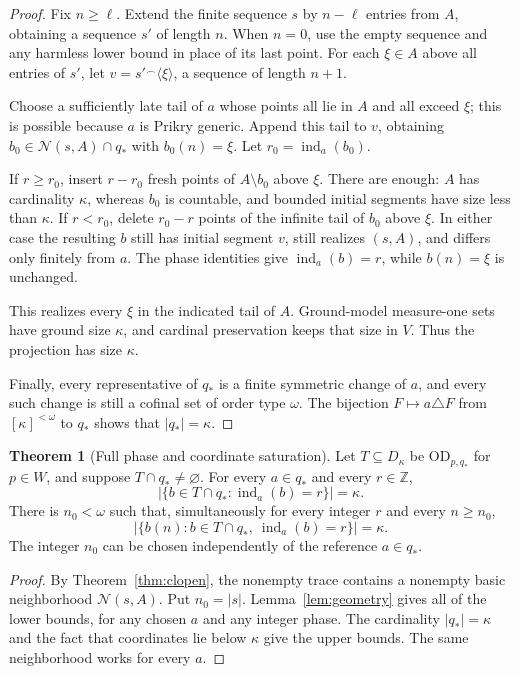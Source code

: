 \documentclass[11pt,letterpaper]{article}
\theoremstyle{definition}
\newtheorem{theorem}[definition]{Theorem}
\numberwithin{equation}{section}
\newcommand{\OD}{\mathrm{OD}}
\newcommand{\ch}{\operatorname{ind}}
\newcommand{\seq}[1]{\langle #1\rangle}
\begin{document}
\begin{proof}
Fix $n\ge\ell$. Extend the finite sequence $s$ by $n-\ell$ entries from $A$,
obtaining a sequence $s'$ of length $n$. When $n=0$, use the empty
sequence and any harmless lower bound in place of its last point. For
each $\xi\in A$ above all entries of $s'$, let
$v=s'{}^\frown\seq{\xi}$, a sequence of length $n+1$.

Choose a sufficiently late tail of $a$ whose points all lie in $A$ and
all exceed $\xi$; this is possible because $a$ is Prikry generic. Append
this tail to $v$, obtaining $b_0\in\mathcal N(s,A)\cap q_*$ with
$b_0(n)=\xi$. Let $r_0=\ch_a(b_0)$.

If $r\ge r_0$, insert $r-r_0$ fresh points of $A\setminus b_0$ above $\xi$.
There are enough: $A$ has cardinality $\kappa$, whereas $b_0$ is countable,
and bounded initial segments have size less than $\kappa$. If $r<r_0$,
delete $r_0-r$ points of the infinite tail of $b_0$ above $\xi$. In either
case the resulting $b$ still has initial segment $v$, still realizes
$(s,A)$, and differs only finitely from $a$. The phase identities give
$\ch_a(b)=r$, while $b(n)=\xi$ is unchanged.

This realizes every $\xi$ in the indicated tail of $A$. Ground-model
measure-one sets have ground size $\kappa$, and cardinal preservation
keeps that size in $V$. Thus the projection has size $\kappa$.

Finally, every representative of $q_*$ is a finite symmetric change of
$a$, and every such change is still a cofinal set of order type $\omega$.
The bijection $F\mapsto a\triangle F$ from $[\kappa]^{<\omega}$ to $q_*$
shows that $|q_*|=\kappa$.
\end{proof}

\begin{theorem}[Full phase and coordinate saturation]\label{thm:phase}
Let $T\subseteq D_\kappa$ be $\OD_{p,q_*}$ for $p\in W$, and suppose
$T\cap q_*\ne\varnothing$. For every $a\in q_*$ and every $r\in\mathbb Z$,
\[
                    |\{b\in T\cap q_*:\ch_a(b)=r\}|=\kappa.
\]
There is $n_0<\omega$ such that, simultaneously for every integer $r$ and
every $n\ge n_0$,
\[
          |\{b(n):b\in T\cap q_*,\ \ch_a(b)=r\}|=\kappa.
\]
The integer $n_0$ can be chosen independently of the reference $a\in q_*$.
\end{theorem}

\begin{proof}
By Theorem~\ref{thm:clopen}, the nonempty trace contains a nonempty basic
neighborhood $\mathcal N(s,A)$. Put $n_0=|s|$. Lemma~\ref{lem:geometry}
gives all of the lower bounds, for any chosen $a$ and any integer phase.
The cardinality $|q_*|=\kappa$ and the fact that coordinates lie below
$\kappa$ give the upper bounds. The same neighborhood works for every $a$.
\end{proof}
\end{document}
